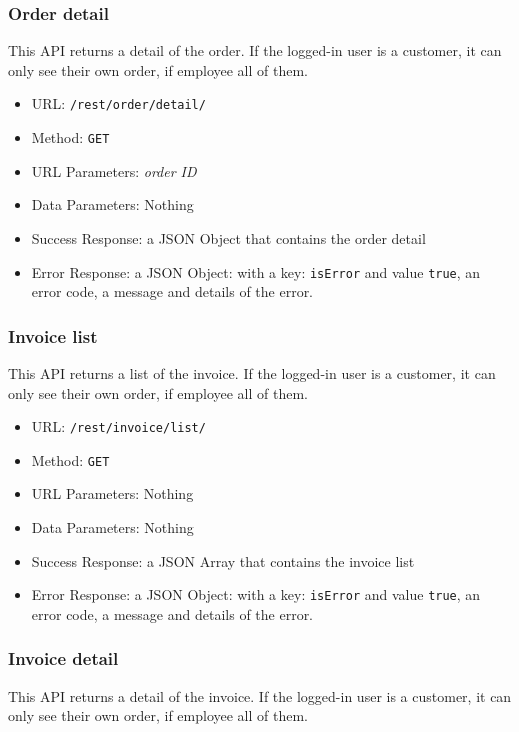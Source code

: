\subsubsection*{Order detail}

This API returns a detail of the order.
If the logged-in user is a customer, it can only see their own order, if employee all of them.

\begin{itemize}
    \item URL: \texttt{/rest/order/detail/}
    \item Method: \texttt{GET}
    \item URL Parameters: \textit{order ID}
    \item Data Parameters: Nothing
    \item Success Response: a JSON Object that contains the order detail
    \item Error Response: a JSON Object: with a key: \texttt{isError}  and value \texttt{true}, an error code, a message and details of the error.
\end{itemize}


\subsubsection*{Invoice list}

This API returns a list of the invoice.
If the logged-in user is a customer, it can only see their own order, if employee all of them.

\begin{itemize}
    \item URL: \texttt{/rest/invoice/list/}
    \item Method: \texttt{GET}
    \item URL Parameters: Nothing
    \item Data Parameters: Nothing
    \item Success Response:  a JSON Array that contains the invoice list
    \item Error Response: a JSON Object: with a key: \texttt{isError}  and value \texttt{true}, an error code, a message and details of the error.
\end{itemize}

\subsubsection*{Invoice detail}

This API returns a detail of the invoice.
If the logged-in user is a customer, it can only see their own order, if employee all of them.

